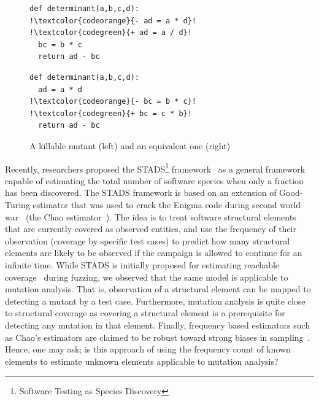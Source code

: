 \documentclass[sigconf,review,anonymous]{acmart}
\begin{document}
\begin{figure}[t]
\begin{minipage}{.45\columnwidth}  %
\begin{lstlisting}[style=python,escapechar=!]
def determinant(a,b,c,d):
!\textcolor{codeorange}{- ad = a * d}!
!\textcolor{codegreen}{+ ad = a / d}!
  bc = b * c
  return ad - bc
\end{lstlisting}
\end{minipage}
\hfill
\begin{minipage}{0.5\columnwidth} %
\begin{lstlisting}[style=python,escapechar=!, numbers=none]
def determinant(a,b,c,d):
  ad = a * d
!\textcolor{codeorange}{- bc = b * c}!
!\textcolor{codegreen}{+ bc = c * b}!
  return ad - bc
\end{lstlisting}
\end{minipage}
\caption{A killable mutant (left) and an equivalent one (right)}
\label{fig:working-example-mutants}
\end{figure}

Recently, researchers proposed the STADS\footnote{
Software Testing as Species Discovery
} framework~\cite{bohme2018assurances}
as a general framework capable of estimating the total number of software
species when only a fraction has been discovered.
The STADS framework is based on an extension of Good-Turing estimator that was used to crack the Enigma code during second world war~\cite{fuzzingbook2023:WhenToStopFuzzing}
(the Chao estimator~\cite{chao2016nonparametric}).
The idea is to treat software structural elements that are currently covered as observed entities, and use the frequency of their observation (coverage by specific test cases) to predict how many structural
elements are likely to be observed if the campaign is allowed to continue for an infinite time.
While STADS is initially proposed for estimating reachable coverage~\cite{fuzzingbook2023:WhenToStopFuzzing} during fuzzing, we observed that the same model is applicable to mutation analysis. That is, observation of a structural element can be mapped to detecting a mutant by a test case. Furthermore, mutation analysis is quite close to structural coverage
as covering a structural element is a prerequisite for detecting any mutation in that element.
Finally, frequency based estimators such as Chao's estimators are claimed to be robust toward strong biases in sampling~\cite{chao2016species}.
Hence, one may ask; is this approach of using the frequency count of known elements to estimate unknown elements applicable to mutation analysis?
\end{document}
